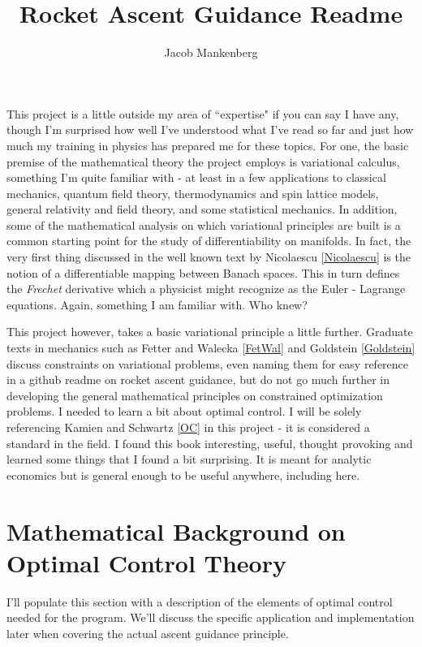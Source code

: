 \documentclass[11pt]{article}
\numberwithin{equation}{section}
\begin{document}
\title{Rocket Ascent Guidance Readme}
\author{Jacob Mankenberg}
\maketitle



This project is a little outside my area of ``expertise" if you can say I have any, though I'm surprised how well I've understood what I've read so far and just how much my training in physics has prepared me for these topics. For one, the basic premise of the mathematical theory the project employs is variational calculus, something I'm quite familiar with - at least in a few applications to classical mechanics, quantum field theory, thermodynamics and spin lattice models, general relativity and field theory, and some statistical mechanics. In addition, some of the mathematical analysis on which variational principles are built is a common starting point for the study of differentiability on manifolds. In fact, the very first thing discussed in the well known text by Nicolaescu \ref{Nicolaescu} is the notion of a differentiable mapping between Banach spaces. This in turn defines the \textit{Frechet} derivative which a physicist might recognize as the Euler - Lagrange equations. Again, something I am familiar with. Who knew?

This project however, takes a basic variational principle a little further. Graduate texts in mechanics such as Fetter and Walecka \ref{FetWal} and Goldstein \ref{Goldstein} discuss constraints on variational problems, even naming them for easy reference in a github readme on rocket ascent guidance, but do not go much further in developing the general mathematical principles on constrained optimization problems. I needed to learn a bit about optimal control. I will be solely referencing Kamien and Schwartz \ref{OC} in this project - it is considered a standard in the field. I found this book interesting, useful, thought provoking and learned some things that I found a bit surprising. It is meant for analytic economics but is general enough to be useful anywhere, including here.

\section{Mathematical Background on Optimal Control Theory}
I'll populate this section with a description of the elements of optimal control needed for the program. We'll discuss the specific application and implementation later when covering the actual ascent guidance principle.
\end{document}
